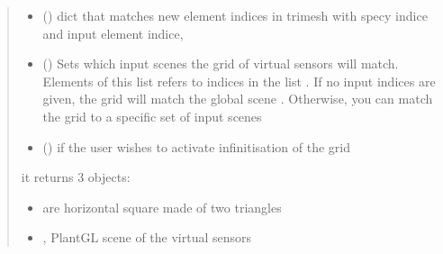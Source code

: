 \documentclass[letterpaper,10pt,english]{sphinxmanual}
\begin{document}
\begin{fulllineitems}
\begin{quote}
\begin{description}
\begin{itemize}
\begin{sphinxVerbatim}[commandchars=\\\{\}]
   \PYG{p}{[}  \PYG{p}{]}
\end{sphinxVerbatim}


\item {} 
\sphinxAtStartPar
{} () \textendash{} dict that matches new element indices in trimesh with specy indice and
input element indice, 

\item {} 
\sphinxAtStartPar
{} () \textendash{} Sets which input scenes the grid of virtual sensors will match. 
Elements of this list refers to indices in the list .
If no input indices are given, the grid will match the global scene . 
Otherwise, you can match the grid to a specific set of input scenes

\item {} 
\sphinxAtStartPar
{} () \textendash{} if the user wishes to activate infinitisation of the grid

\end{itemize}

\sphinxAtStartPar

\sphinxAtStartPar
it returns 3 objects:
\begin{itemize}
\item {} \begin{description}
\sphinxAtStartPar
are horizontal square made of two triangles 

\end{description}

\item {} 
\sphinxAtStartPar
{}, PlantGL scene of the virtual sensors


\end{itemize}
\end{description}
\end{quote}
\end{fulllineitems}
\end{document}
